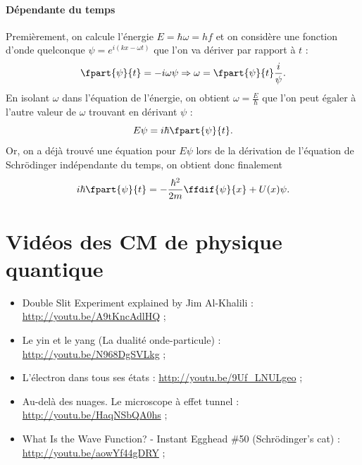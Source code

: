 \paragraph{Dépendante du temps}
Premièrement, on calcule l'énergie $E = \hbar\omega = hf$ et on
considère une fonction d'onde quelconque $\psi = e^{i(kx-\omega t)}$
que l'on va dériver par rapport à $t$ :
\[ \fpart{\psi}{t} = -i\omega\psi \Rightarrow \omega = \fpart{\psi}{t}\frac{i}{\psi}.\]
En isolant $\omega$ dans l'équation de l'énergie, on obtient $\omega = \frac{E}{\hbar}$
que l'on peut égaler à l'autre valeur de $\omega$ trouvant en dérivant $\psi$ :
\[ E\psi = i\hbar\fpart{\psi}{t}.\]
Or, on a déjà trouvé une équation pour $E\psi$ lors de la dérivation de l'équation
de Schrödinger indépendante du temps, on obtient donc finalement
\[ i\hbar\fpart{\psi}{t} = -\frac{\hbar^2}{2m}\ffdif{\psi}{x} + U(x)\psi.\]

\section{Vidéos des CM de physique quantique}
\label{sec:videos}
\begin{itemize}
	\item Double Slit Experiment explained by Jim Al-Khalili :
	\url{http://youtu.be/A9tKncAdlHQ} ;
	\item Le yin et le yang (La dualité onde-particule) :
	\url{http://youtu.be/N968DgSVLkg} ;
	\item L'électron dans tous ses états :
	\url{http://youtu.be/9Uf_LNULgeo} ;
	\item Au-delà des nuages. Le microscope à effet tunnel :
	\url{http://youtu.be/HaqNSbQA0hs} ;
	\item What Is the Wave Function? - Instant Egghead \#50
	(Schrödinger's cat) : \url{http://youtu.be/aowYf44gDRY} ;
\end{itemize}

